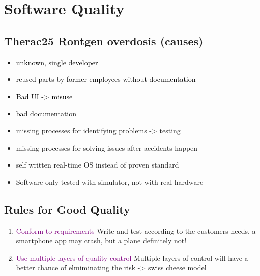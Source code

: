 \documentclass[main.tex,fontsize=8pt,paper=a4,paper=portrait,DIV=calc,]{scrartcl}
\begin{document}
\tableofcontents

\newcommand{\TITLE}{Software Engineering Practises 2}
\newcommand{\AUTHOR}{Fabio Lenherr}
\setcounter{tocdepth}{1}

\section{Software Quality}
\subsection{Therac25 Rontgen overdosis (causes)}
\begin{itemize}
\item \textcolor{black}{unknown, single developer}
\item \textcolor{black}{reused parts by former employees without documentation}
\item \textcolor{black}{Bad UI -> misuse}
\item \textcolor{black}{bad documentation}
\item missing processes for identifying problems -> testing
\item missing processes for solving issues after accidents happen 
\item self written real-time OS instead of proven standard 
\item Software only tested with simulator, not with real hardware
\end{itemize} 

\subsection{Rules for Good Quality}
\begin{enumerate}
\item \textcolor{purple}{Conform to requirements}\newline
Write and test according to the customers needs, a smartphone app may crash, but a plane definitely not!
\item \textcolor{purple}{Use multiple layers of quality control}\newline
  Multiple layers of control will have a better chance of elmiminating the risk -> swiss cheese model
\end{enumerate} 
\end{document}
